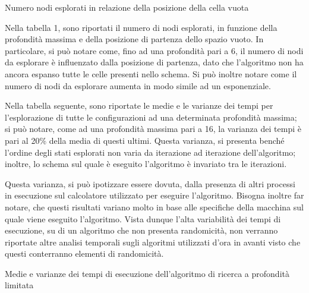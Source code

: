 \documentclass[letterpaper, 10 pt]{IEEEconf}
\begin{document}
\begin{table}[!h]
\centering

\caption{Numero nodi esplorati in relazione della posizione della cella vuota}
\end{table}

Nella tabella 1, sono riportati il numero di nodi esplorati, in funzione della profondità massima e della posizione di partenza dello spazio vuoto. In particolare, si può notare come, fino ad una profondità pari a 6, il numero di nodi da esplorare è influenzato dalla posizione di partenza, dato che l'algoritmo non ha ancora espanso tutte le celle presenti nello schema.
Si può inoltre notare come il numero di nodi da esplorare aumenta in modo simile ad un esponenziale.\par
Nella tabella seguente, sono riportate le medie e le varianze dei tempi per l'esplorazione di tutte le configurazioni ad una determinata profondità massima; si può notare, come ad una profondità massima pari a 16, la varianza dei tempi è pari al 20\% della media di questi ultimi.
Questa varianza, si presenta benché l'ordine degli stati esplorati non varia da iterazione ad iterazione dell'algoritmo; inoltre, lo schema sul quale è eseguito l'algoritmo è invariato tra le iterazioni.\par
Questa varianza, si può ipotizzare essere dovuta, dalla presenza di altri processi in esecuzione sul calcolatore utilizzato per eseguire l'algoritmo. Bisogna inoltre far notare, che questi risultati variano molto in base alle specifiche della macchina sul quale viene eseguito l'algoritmo.
Vista dunque l'alta variabilità dei tempi di esecuzione, su di un algoritmo che non presenta randomicità, non verranno riportate altre analisi temporali sugli algoritmi utilizzati d'ora in avanti visto che questi conterranno elementi di randomicità.

\begin{table}[!h]
\centering

\caption{Medie e varianze dei tempi di esecuzione dell'algoritmo di ricerca a profondità limitata}
\end{table}
\end{document}
